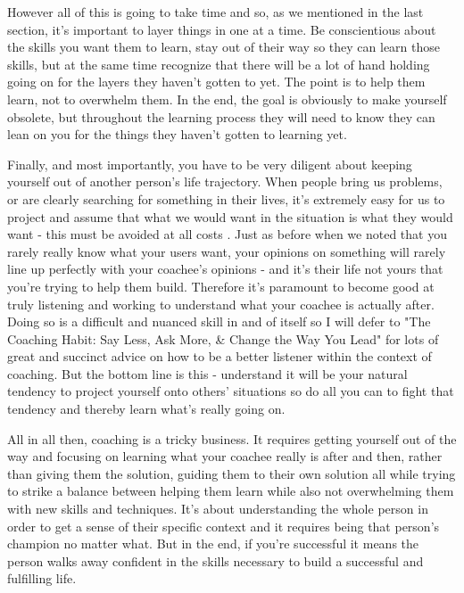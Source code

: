 \documentclass[11pt,a5paper]{book}
\begin{document}
However all of this is going to take time and so, as we mentioned in the last section, it's important to layer things in one at a time. Be conscientious about the skills you want them to learn, stay out of their way so they can learn those skills, but at the same time recognize that there will be a lot of hand holding going on for the layers they haven't gotten to yet. The point is to help them learn, not to overwhelm them. In the end, the goal is obviously to make yourself obsolete, but throughout the learning process they will need to know they can lean on you for the things they haven't gotten to learning yet.
\newline

Finally, and most importantly, you have to be very diligent about keeping yourself out of another person's life trajectory. When people bring us problems, or are clearly searching for something in their lives, it's extremely easy for us to project and assume that what we would want in the situation is what they would want - this must be avoided at all costs \cite{stanier}. Just as before when we noted that you rarely really know what your users want, your opinions on something will rarely line up perfectly with your coachee's opinions - and it's their life not yours that you're trying to help them build. Therefore it's paramount to become good at truly listening and working to understand what your coachee is actually after. Doing so is a difficult and nuanced skill in and of itself so I will defer to "The Coaching Habit: Say Less, Ask More, \& Change the Way You Lead" \cite{stanier} for lots of great and succinct advice on how to be a better listener within the context of coaching. But the bottom line is this - understand it will be your natural tendency to project yourself onto others' situations so do all you can to fight that tendency and thereby learn what's really going on.
\newline

All in all then, coaching is a tricky business. It requires getting yourself out of the way and focusing on learning what your coachee really is after and then, rather than giving them the solution, guiding them to their own solution all while trying to strike a balance between helping them learn while also not overwhelming them with new skills and techniques. It's about understanding the whole person in order to get a sense of their specific context and it requires being that person's champion no matter what. But in the end, if you're successful it means the person walks away confident in the skills necessary to build a successful and fulfilling life. 
\newline
\end{document}
